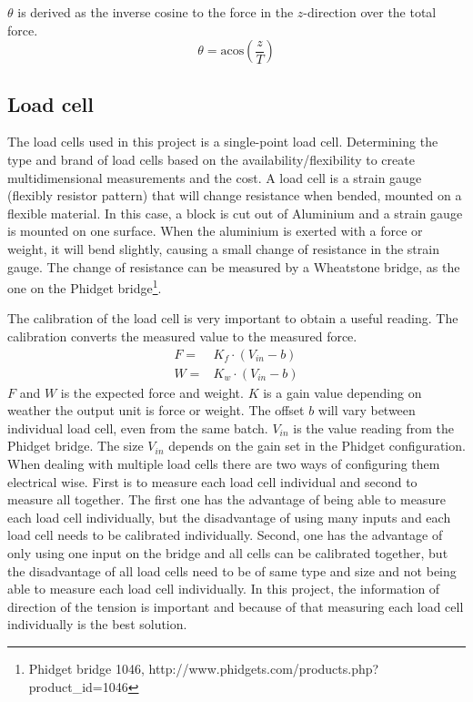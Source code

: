 \noindent
$\theta$ is derived as the inverse cosine to the force in the $z$-direction over the total force.
\begin{equation}
\theta = \mathrm{acos}\left( \frac{z}{T} \right)
\end{equation}

\subsection{Load cell}
The load cells used in this project is a single-point load cell. Determining the type and brand of load cells based on the availability/flexibility to create multidimensional measurements and the cost. A load cell is a strain gauge (flexibly resistor pattern) that will change resistance when bended, mounted on a flexible material. In this case, a block is cut out of Aluminium and a strain gauge is mounted on one surface. When the aluminium is exerted with a force or weight, it will bend slightly, causing a small change of resistance in the strain gauge. The change of resistance can be measured by a Wheatstone bridge, as the one on the Phidget bridge\footnote{Phidget bridge 1046, http://www.phidgets.com/products.php?product\_id=1046}.

\noindent
The calibration of the load cell is very important to obtain a useful reading. The calibration converts the measured value to the measured force.  
\begin{eqnarray}
F =& K_f \cdot (V_{in} - b)\\
W =& K_w \cdot (V_{in} - b)
\end{eqnarray}
$F$ and $W$ is the expected force and weight. $K$ is a gain value depending on weather the output unit is force or weight. The offset $b$ will vary between individual load cell, even from the same batch. $V_{in}$ is the value reading from the Phidget bridge. The size $V_{in}$ depends on the gain set in the Phidget configuration.\\
\noindent
When dealing with multiple load cells there are two ways of configuring them electrical wise. First is to measure each load cell individual and second to measure all together. The first one has the advantage of being able to measure each load cell individually, but the disadvantage of using many inputs and each load cell needs to be calibrated individually. Second, one has the advantage of only using one input on the bridge and all cells can be calibrated together, but the disadvantage of all load cells need to be of same type and size and not being able to measure each load cell individually. In this project, the information of direction of the tension is important and because of that measuring each load cell individually is the best solution\cite{PhidgetsInc.2012}.

